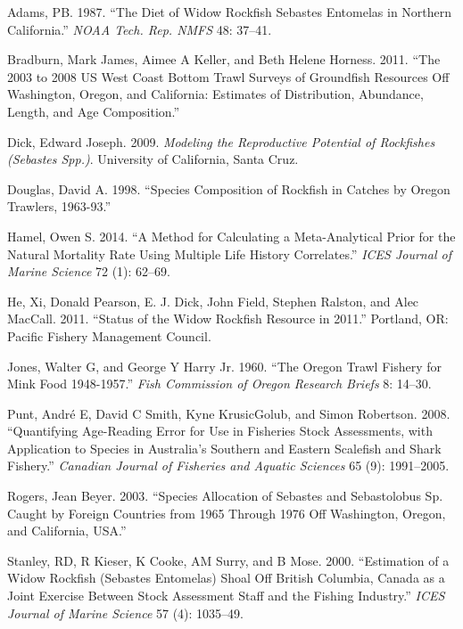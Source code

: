 \documentclass[
]{scrartcl}
\newlength{\cslhangindent}
\newenvironment{CSLReferences}[2] %
 {\begin{list}{}{%
  \setlength{\itemindent}{0pt}
  \setlength{\leftmargin}{0pt}
  \setlength{\parsep}{0pt}
  \ifodd #1
   \setlength{\leftmargin}{\cslhangindent}
   \setlength{\itemindent}{-1\cslhangindent}
  \fi
  \setlength{\itemsep}{#2\baselineskip}}}
 {\end{list}}
\begin{document}
\label{refs}
\begin{CSLReferences}{1}{0}
Adams, PB. 1987. {``The Diet of Widow Rockfish {Sebastes} Entomelas in
Northern {California}.''} \emph{NOAA Tech. Rep. NMFS} 48: 37--41.

Bradburn, Mark James, Aimee A Keller, and Beth Helene Horness. 2011.
{``The 2003 to 2008 {US} {West} {Coast} Bottom Trawl Surveys of
Groundfish Resources Off {Washington}, {Oregon}, and {California}:
Estimates of Distribution, Abundance, Length, and Age Composition.''}

Dick, Edward Joseph. 2009. \emph{Modeling the Reproductive Potential of
Rockfishes ({Sebastes} Spp.)}. University of California, Santa Cruz.

Douglas, David A. 1998. {``Species Composition of Rockfish in Catches by
{Oregon} Trawlers, 1963-93.''}

Hamel, Owen S. 2014. {``A Method for Calculating a Meta-Analytical Prior
for the Natural Mortality Rate Using Multiple Life History
Correlates.''} \emph{ICES Journal of Marine Science} 72 (1): 62--69.

He, Xi, Donald Pearson, E. J. Dick, John Field, Stephen Ralston, and
Alec MacCall. 2011. {``Status of the Widow Rockfish Resource in 2011.''}
Portland, OR: Pacific Fishery Management Council.

Jones, Walter G, and George Y Harry Jr. 1960. {``The {Oregon} Trawl
Fishery for Mink Food 1948-1957.''} \emph{Fish Commission of Oregon
Research Briefs} 8: 14--30.

Punt, André E, David C Smith, Kyne KrusicGolub, and Simon Robertson.
2008. {``Quantifying Age-Reading Error for Use in Fisheries Stock
Assessments, with Application to Species in {Australia}'s Southern and
Eastern Scalefish and Shark Fishery.''} \emph{Canadian Journal of
Fisheries and Aquatic Sciences} 65 (9): 1991--2005.

Rogers, Jean Beyer. 2003. {``Species Allocation of {Sebastes} and
{Sebastolobus} Sp. Caught by Foreign Countries from 1965 Through 1976
Off {Washington}, {Oregon}, and {California}, {USA}.''}

Stanley, RD, R Kieser, K Cooke, AM Surry, and B Mose. 2000.
{``Estimation of a Widow Rockfish ({Sebastes} Entomelas) Shoal Off
{British} {Columbia}, {Canada} as a Joint Exercise Between Stock
Assessment Staff and the Fishing Industry.''} \emph{ICES Journal of
Marine Science} 57 (4): 1035--49.

\end{CSLReferences}
\end{document}
